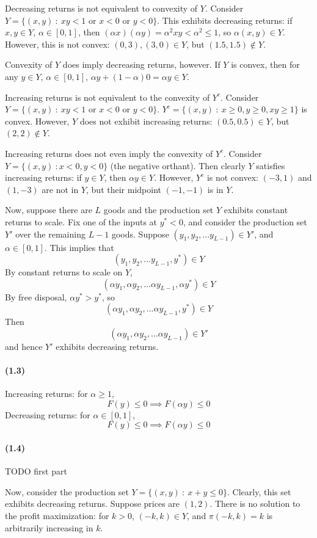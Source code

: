 \documentclass[10pt,letter]{article}
\begin{document}
Decreasing returns is not equivalent to convexity of $Y$. Consider $Y = \{ (x,y) \ : \ xy < 1 \text{ or } x < 0 \text{ or }  y < 0\}$. This exhibits decreasing returns: if $x,y \in Y$, $\alpha \in [0,1]$, then $(\alpha x)(\alpha y) = \alpha^2xy < \alpha^2 \le 1 $, so $\alpha (x,y) \in Y$. However, this is not convex: $(0,3), (3, 0) \in Y$, but $(1.5, 1.5) \not \in Y$.

Convexity of $Y$ does imply decreasing returns, however. If $Y$ is convex, then for any $y \in Y$, $\alpha \in [0,1]$, $\alpha y + (1-\alpha) 0 = \alpha y \in Y$.

Increasing returns is not equivalent to the convexity of $Y^c$. Consider $Y = \{ (x,y) \ : \ xy < 1 \text{ or } x < 0 \text{ or }  y < 0\}$. $Y^c = \{ (x,y) \ : \ x \ge 0, y \ge 0, xy \ge 1\} $ is convex. However, $Y$ does not exhibit increasing returns: $(0.5, 0.5) \in Y$, but $(2,2) \not \in Y$.

Increasing returns does not even imply the convexity of $Y^c$. Consider $Y = \{ (x,y) \ : x < 0, y < 0 \}$ (the negative orthant). Then clearly $Y$ satisfies increasing returns: if $y \in Y$, then $\alpha y \in Y$. However, $Y^c$ is not convex: $(-3, 1)$ and $(1, -3)$ are not in $Y$, but their midpoint $(-1, -1)$ is in $Y$.

Now, suppose there are $L$ goods and the production set $Y$ exhibits constant returns to scale. Fix one of the inputs at $y^* < 0$, and consider the production set $Y'$ over the remaining $L-1$ goods. Suppose $(y_1, y_2, ... y_{L-1}) \in Y'$, and $\alpha \in [0,1]$. This implies that
\[ (y_1, y_2, ... y_{L-1}, y^*) \in Y \]
By constant returns to scale on $Y$,
\[ (\alpha y_1, \alpha y_2, ... \alpha y_{L-1}, \alpha y^*) \in Y \]
By free disposal, $\alpha y^* > y^*$, so
\[ (\alpha y_1, \alpha y_2, ... \alpha y_{L-1}, y^*) \in Y \]
Then
\[ (\alpha y_1, \alpha y_2, ... \alpha y_{L-1}) \in Y' \]
and hence $Y'$ exhibits decreasing returns.
\paragraph{(1.3)}
Increasing returns: for $\alpha \ge 1$,
\[ F(y) \le 0 \implies F(\alpha y) \le 0 \]
Decreasing returns: for $\alpha \in [0,1]$,
\[ F(y) \le 0 \implies F(\alpha y) \le 0 \]
\paragraph{(1.4)}
TODO first part

Now, consider the production set $Y = \{(x,y) \ : \ x + y \le 0 \}$. Clearly, this set exhibits decreasing returns. Suppose prices are $(1, 2)$. There is no solution to the profit maximization: for $k > 0$, $(-k, k) \in Y$, and $\pi(-k, k) = k$ is arbitrarily increasing in $k$.
\end{document}
